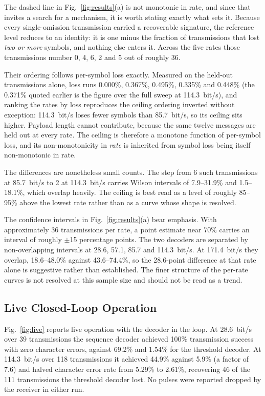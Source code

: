 The dashed line in Fig.~\ref{fig:results}(a) is not monotonic in rate, and
since that invites a search for a mechanism, it is worth stating exactly what
sets it. Because every single-omission transmission carried a recoverable
signature, the reference level reduces to an identity: it is one minus the
fraction of transmissions that lost \emph{two or more} symbols, and nothing
else enters it. Across the five rates those transmissions number 0, 4, 6, 2 and
5 out of roughly 36.

Their ordering follows per-symbol loss exactly. Measured on the held-out
transmissions alone, loss runs 0.000\%, 0.367\%, 0.495\%, 0.335\% and 0.448\%
(the 0.371\% quoted earlier is the figure over the full sweep at
114.3~bit/s), and ranking the rates by loss reproduces the ceiling ordering
inverted without exception: 114.3~bit/s loses fewer symbols than 85.7~bit/s, so
its ceiling sits higher. Payload length cannot contribute, because the same
twelve messages are held out at every rate. The ceiling is therefore a monotone
function of per-symbol loss, and its non-monotonicity in \emph{rate} is
inherited from symbol loss being itself non-monotonic in rate.

The differences are nonetheless small counts. The step from 6 such
transmissions at 85.7~bit/s to 2 at 114.3~bit/s carries Wilson intervals of
7.9--31.9\% and 1.5--18.1\%, which overlap heavily. The ceiling is best read as
a level of roughly 85--95\% above the lowest rate rather than as a curve whose
shape is resolved.

The confidence intervals in Fig.~\ref{fig:results}(a) bear emphasis. With
approximately 36 transmissions per rate, a point estimate near 70\% carries an
interval of roughly $\pm$15 percentage points. The two decoders are separated
by non-overlapping intervals at 28.6, 57.1, 85.7 and 114.3~bit/s. At
171.4~bit/s they overlap, 18.6--48.0\% against 43.6--74.4\%, so the
28.6-point difference at that rate alone is suggestive rather than established.
The finer structure of the per-rate curves is not resolved at this sample size
and should not be read as a trend.

\subsection{Live Closed-Loop Operation}

Fig.~\ref{fig:live} reports live operation with the decoder in the loop. At
28.6~bit/s over 39 transmissions the sequence decoder achieved 100\%
transmission success with zero character errors, against 69.2\% and 1.54\% for
the threshold
decoder. At 114.3~bit/s over 118 transmissions it achieved 44.9\% against 5.9\%
(a factor of 7.6) and halved character error rate from 5.29\% to 2.61\%,
recovering 46 of the 111 transmissions the threshold decoder lost. No pulses
were reported dropped by the receiver in either run.

